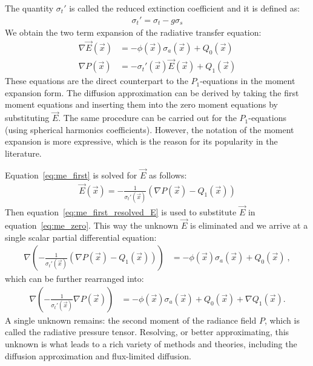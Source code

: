 The quantity $\sigma_t'$ is called the reduced extinction coefficient and it is defined as:
\begin{align*}
\sigma_t' = \sigma_t - g\sigma_s
\end{align*}
We obtain the two term expansion of the radiative transfer equation:
\begin{align}
\label{eq:me_zero}
\nabla\vec{E}\left(\vec{x}\right)&=
-\phi(\vec{x})\sigma_a(\vec{x})
+Q_0\left(\vec{x}\right)
\\
\label{eq:me_first}
\nabla P\left(\vec{x}\right) &= -\sigma_t'(\vec{x})\vec{E}\left(\vec{x}\right)
+Q_1\left(\vec{x}\right)
\end{align}
These equations are the direct counterpart to the $P_1$-equations in the moment expansion form. The diffusion approximation can be derived by taking the first moment equations and inserting them into the zero moment equations by substituting $\vec{E}$. The same procedure can be carried out for the $P_1$-equations (using spherical harmonics coefficients). However, the notation of the moment expansion is more expressive, which is the reason for its popularity in the literature.

Equation~\ref{eq:me_first} is solved for $\vec{E}$ as follows:
\begin{align}
\label{eq:me_first_resolved_E}
\vec{E}\left(\vec{x}\right) =
-\frac{1}{\sigma_t'\left(\vec{x}\right)}
\left(
\nabla P\left(\vec{x}\right)
-Q_1\left(\vec{x}\right)
\right)
\end{align}
Then equation~\ref{eq:me_first_resolved_E} is used to substitute $\vec{E}$ in equation~\ref{eq:me_zero}. This way the unknown $\vec{E}$ is eliminated and we arrive at a single scalar partial differential equation:
\begin{align}
\nabla
\left(
-\frac{1}{\sigma_t'\left(\vec{x}\right)}
\left(
\nabla P\left(\vec{x}\right)
-Q_1\left(\vec{x}\right)
\right)
\right)&=
-\phi(\vec{x})\sigma_a(\vec{x})
+Q_0\left(\vec{x}\right)
\ ,
\end{align}
which can be further rearranged into:
\begin{align}
\label{eq:general_diffusion_equation}
\nabla
\left(
-\frac{1}{\sigma_t'\left(\vec{x}\right)}
\nabla P\left(\vec{x}\right)
\right)&=
-\phi(\vec{x})\sigma_a(\vec{x})
+Q_0\left(\vec{x}\right)
+\nabla Q_1\left(\vec{x}\right)
.
\end{align}
A single unknown remains: the second moment of the radiance field $P$, which is called the radiative pressure tensor. Resolving, or better approximating, this unknown is what leads to a rich variety of methods and theories, including the diffusion approximation and flux-limited diffusion.
